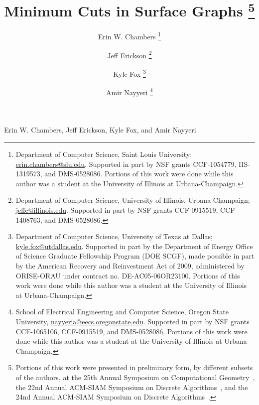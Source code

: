 \documentclass[11pt,twoside]{article}
\begin{document}
\pagestyle{myheadings}
		 {Erin W. Chambers, Jeff Erickson, Kyle Fox, and Amir Nayyeri}

\begin{titlepage}

\title{Minimum Cuts in Surface Graphs%
\thanks{
Portions of this work were presented in preliminary form, by different subsets of the authors, at the 25th Annual Symposium on Computational Geometry~\cite{cen-mcshc-09}, the 22nd Annual ACM-SIAM Symposium on Discrete Algorithms~\cite{en-mcsnc-11}, and the 24nd Annual ACM-SIAM Symposium on Discrete Algorithms~\cite{efn-gmcse-12}.
}}

\author{
Erin W. Chambers%
	\thanks{Department of Computer Science,
	Saint Louis University;
	\url{erin.chambers@slu.edu}.
	Supported in part by NSF grants CCF-1054779, IIS-1319573, and DMS-0528086.
	Portions of this work were done while this author was a student at the University of Illinois at Urbana-Champaign.}
%
\and
Jeff Erickson%
	\thanks{Department of Computer Science,
	University of Illinois, Urbana-Champaign;
	\url{jeffe@illinois.edu}.
	Supported in part by NSF grants CCF-0915519, CCF-1408763, and DMS-0528086.
  }
%
\and
Kyle Fox%
	\thanks{Department of Computer Science,
	University of Texas at Dallas;
	\url{kyle.fox@utdallas.edu}.
	Supported in part by the Department of Energy Office of Science Graduate Fellowship Program (DOE SCGF), made possible in part by the American Recovery and Reinvestment Act of 2009, administered by ORISE-ORAU under contract no. DE-AC05-06OR23100.
	Portions of this work were done while this author was a student at the University of Illinois at Urbana-Champaign.}
%
\and
Amir Nayyeri%
	\thanks{School of Electrical Engineering and Computer Science,
	Oregon State University,
	\url{nayyeria@eecs.oregonstate.edu}.
	Supported in part by NSF grants CCF-1065106, CCF-0915519, and DMS-0528086.
	Portions of this work were done while this author was a student at the University of Illinois at Urbana-Champaign.}
}

\DRAFT

\maketitle
\begin{abstract}


\end{abstract}
\end{titlepage}
\end{document}

